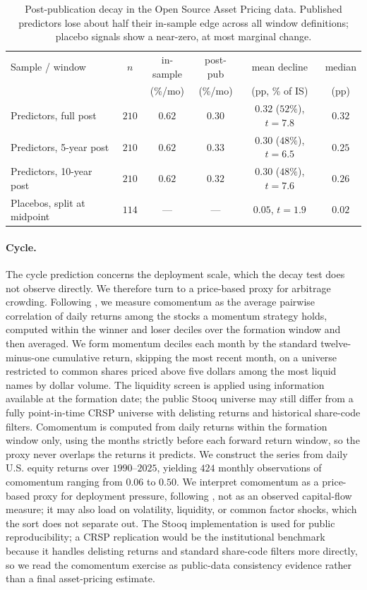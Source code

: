 \documentclass[11pt]{article}
\theoremstyle{plain}
\theoremstyle{definition}
\begin{document}
\begin{table}[h]
\centering
\begin{tabular}{lccccc}
\toprule
Sample / window & $n$ & in-sample & post-pub & mean decline & median \\
 & & (\%/mo) & (\%/mo) & (pp, \% of IS) & (pp) \\
\midrule
Predictors, full post & $210$ & $0.62$ & $0.30$ & $0.32$ ($52\%$), $t{=}7.8$ & $0.32$ \\
Predictors, 5-year post & $210$ & $0.62$ & $0.33$ & $0.30$ ($48\%$), $t{=}6.5$ & $0.25$ \\
Predictors, 10-year post & $210$ & $0.62$ & $0.32$ & $0.30$ ($48\%$), $t{=}7.6$ & $0.26$ \\
Placebos, split at midpoint & $114$ & --- & --- & $0.05$, $t{=}1.9$ & $0.02$ \\
\bottomrule
\end{tabular}
\caption{Post-publication decay in the Open Source Asset Pricing data. Published predictors lose about half their in-sample edge across all window definitions; placebo signals show a near-zero, at most marginal change.}
\label{tab:decay}
\end{table}

\paragraph{Cycle.}
The cycle prediction concerns the deployment scale, which the decay test does not observe directly. We therefore turn to a price-based proxy for arbitrage crowding. Following \citet{lou2022}, we measure comomentum as the average pairwise correlation of daily returns among the stocks a momentum strategy holds, computed within the winner and loser deciles over the formation window and then averaged. We form momentum deciles each month by the standard twelve-minus-one cumulative return, skipping the most recent month, on a universe restricted to common shares priced above five dollars among the most liquid names by dollar volume. The liquidity screen is applied using information available at the formation date; the public Stooq universe may still differ from a fully point-in-time CRSP universe with delisting returns and historical share-code filters. Comomentum is computed from daily returns within the formation window only, using the months strictly before each forward return window, so the proxy never overlaps the returns it predicts. We construct the series from daily U.S. equity returns over $1990$--$2025$, yielding $424$ monthly observations of comomentum ranging from $0.06$ to $0.50$. We interpret comomentum as a price-based proxy for deployment pressure, following \citet{lou2022}, not as an observed capital-flow measure; it may also load on volatility, liquidity, or common factor shocks, which the sort does not separate out. The Stooq implementation is used for public reproducibility; a CRSP replication would be the institutional benchmark because it handles delisting returns and standard share-code filters more directly, so we read the comomentum exercise as public-data consistency evidence rather than a final asset-pricing estimate.
\end{document}
